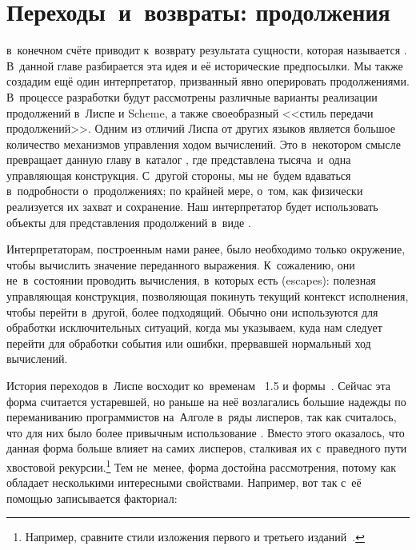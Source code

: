 \chapter{Переходы~и~возвраты: продолжения}\label{chapter:escape}

 в~конечном счёте
приводит к~возврату результата сущности, которая называется .
В~данной главе разбирается эта идея и её исторические предпосылки. Мы также
создадим ещё один интерпретатор, призванный явно оперировать продолжениями.
В~процессе разработки будут рассмотрены различные варианты реализации
продолжений в~Лиспе и Scheme, а также своеобразный <<стиль передачи
продолжений>>. Одним из отличий Лиспа от других языков является большое
количество механизмов управления ходом вычислений. Это в~некотором смысле
превращает данную главу в~каталог \cite{moz87}, где представлена тысяча~и~одна
управляющая конструкция. С~другой стороны, мы не~будем вдаваться в~подробности
о~продолжениях; по крайней мере, о~том, как физически реализуется их захват и
сохранение. Наш интерпретатор будет использовать объекты для представления
продолжений в~виде .

\bigskip

Интерпретаторам, построенным нами ранее, было необходимо только окружение, чтобы
вычислить значение переданного выражения. К~сожалению, они не~в~состоянии
проводить вычисления, в~которых есть  (escapes): полезная
управляющая конструкция, позволяющая покинуть текущий контекст исполнения, чтобы
перейти в~другой, более подходящий. Обычно они используются для обработки
исключительных ситуаций, когда мы указываем, куда нам следует перейти для
обработки события или ошибки, прервавшей нормальный ход вычислений.

История переходов в~Лиспе восходит ко~временам \LISP~1.5 и формы~.
Сейчас эта форма считается устаревшей, но раньше на неё возлагались большие
надежды по переманиванию программистов на~Алголе в~ряды лисперов, так как
считалось, что для них было более привычным использование . Вместо
этого оказалось, что данная форма больше влияет на самих лисперов, сталкивая их
с~праведного пути хвостовой рекурсии.\footnote*{Например, сравните стили
изложения первого и третьего изданий~\cite{wh89}.} Тем не~менее, форма 
достойна рассмотрения, потому как обладает несколькими интересными свойствами.
Например, вот так с~её помощью записывается факториал:

